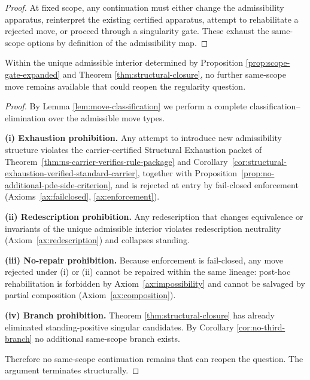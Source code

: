 \begin{proof}
At fixed scope, any continuation must either change the admissibility apparatus, reinterpret the
existing certified apparatus, attempt to rehabilitate a rejected move, or proceed through a
singularity gate. These exhaust the same-scope options by definition of the admissibility map.
\end{proof}

\begin{theorem}[Terminality]\label{thm:terminality}
Within the unique admissible interior determined by Proposition \ref{prop:scope-gate-expanded} and Theorem
\ref{thm:structural-closure}, no further same-scope move remains available that could reopen the
regularity question.
\end{theorem}

\begin{proof}
By Lemma \ref{lem:move-classification} we perform a complete classification–elimination over the admissible move types.

\textbf{(i) Exhaustion prohibition.} Any attempt to introduce new admissibility structure violates the
carrier-certified Structural Exhaustion packet of Theorem~\ref{thm:ns-carrier-verifies-rule-package}
and Corollary~\ref{cor:structural-exhaustion-verified-standard-carrier}, together with
Proposition~\ref{prop:no-additional-pde-side-criterion}, and is rejected at entry by fail-closed
enforcement (Axioms~\ref{ax:failclosed}, \ref{ax:enforcement}).

\textbf{(ii) Redescription prohibition.} Any redescription that changes equivalence or invariants of
the unique admissible interior violates redescription neutrality (Axiom~\ref{ax:redescription}) and collapses standing.

\textbf{(iii) No-repair prohibition.} Because enforcement is fail-closed, any move rejected under
(i) or (ii) cannot be repaired within the same lineage: post-hoc rehabilitation is forbidden by
Axiom~\ref{ax:impossibility} and cannot be salvaged by partial composition (Axiom~\ref{ax:composition}).

\textbf{(iv) Branch prohibition.} Theorem \ref{thm:structural-closure} has already eliminated
standing-positive singular candidates. By Corollary \ref{cor:no-third-branch} no additional same-scope
branch exists.

Therefore no same-scope continuation remains that can reopen the question. The argument terminates
structurally.
\end{proof}


